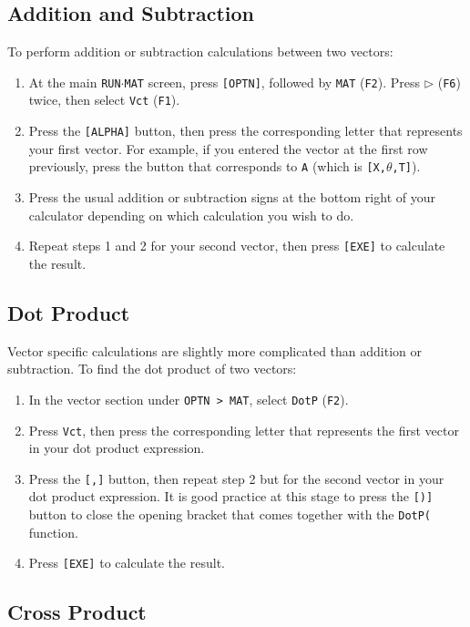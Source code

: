 \documentclass[a5paper]{memoir}
\def\code#1{\texttt{#1}}
\def\runmat{\code{RUN$\cdot$MAT} }
\def\Fsix{(\code{F6}) }
\def\fone{(\code{F1})}
\def\ftwo{(\code{F2})}
\begin{document}
\subsection{Addition and Subtraction}

To perform addition or subtraction calculations between two vectors:

\begin{enumerate}
	\item At the main \runmat screen, press \code{[OPTN]}, followed by \code{MAT} \ftwo. Press \code{$\triangleright$} \Fsix twice, then select \code{Vct} \fone.
	\item Press the \code{[ALPHA]} button, then press the corresponding letter that represents your first vector. For example, if you entered the vector at the first row previously, press the button that corresponds to \code{A} (which is \code{[X,$\theta$,T]}).
	\item Press the usual addition or subtraction signs at the bottom right of your calculator depending on which calculation you wish to do.
	\item Repeat steps 1 and 2 for your second vector, then press \code{[EXE]} to calculate the result.
\end{enumerate}

\subsection{Dot Product}

Vector specific calculations are slightly more complicated than addition or subtraction. To find the dot product of two vectors:

\begin{enumerate}
	\item In the vector section under \code{OPTN > MAT}, select \code{DotP} \ftwo.
	\item Press \code{Vct}, then press the corresponding letter that represents the first vector in your dot product expression.
	\item Press the \code{[,]} button, then repeat step 2 but for the second vector in your dot product expression. It is good practice at this stage to press the \code{[)]} button to close the opening bracket that comes together with the \code{DotP(} function.
	\item Press \code{[EXE]} to calculate the result.
\end{enumerate}

\subsection{Cross Product}
\end{document}
